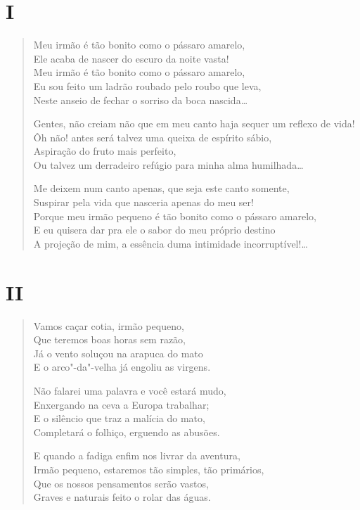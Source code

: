 \section*{I}

\begin{verse}
Meu irmão é tão bonito como o pássaro amarelo,\\
Ele acaba de nascer do escuro da noite vasta!\\
Meu irmão é tão bonito como o pássaro amarelo,\\
Eu sou feito um ladrão roubado pelo roubo que leva,\\
Neste anseio de fechar o sorriso da boca nascida\ldots{}

Gentes, não creiam não que em meu canto haja sequer um reflexo de vida!\\
Ôh não! antes será talvez uma queixa de espírito sábio,\\
Aspiração do fruto mais perfeito,\\
Ou talvez um derradeiro refúgio para minha alma humilhada\ldots{}

Me deixem num canto apenas, que seja este canto somente,\\
Suspirar pela vida que nasceria apenas do meu ser!\\
Porque meu irmão pequeno é tão bonito como o pássaro amarelo,\\
E eu quisera dar pra ele o sabor do meu próprio destino\\
A projeção de mim, a essência duma intimidade incorruptível!\ldots{}
\end{verse}

\medskip
\section*{II}

\begin{verse}
Vamos caçar cotia, irmão pequeno,\\
Que teremos boas horas sem razão,\\
Já o vento soluçou na arapuca do mato\\
E o arco"-da"-velha já engoliu as virgens.

Não falarei uma palavra e você estará mudo,\\
Enxergando na ceva a Europa trabalhar;\\
E o silêncio que traz a malícia do mato,\\
Completará o folhiço, erguendo as abusões.

E quando a fadiga enfim nos livrar da aventura,\\
Irmão pequeno, estaremos tão simples, tão primários,\\
Que os nossos pensamentos serão vastos,\\
Graves e naturais feito o rolar das águas.
\end{verse}

